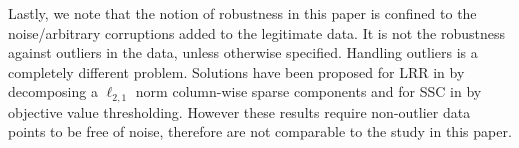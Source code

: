 \documentclass[main]{subfiles}
\begin{document}





Lastly, we note that the notion of robustness in this paper is confined to the noise/arbitrary corruptions added to the legitimate data. It is not the robustness against outliers in the data, unless otherwise specified. Handling outliers is a completely different problem. Solutions have been proposed for LRR in \cite{liu2012aistats} by decomposing a $\ell_{2,1}$ norm column-wise sparse components and for SSC in \cite{soltanolkotabi2011geometric} by objective value thresholding. However these results require non-outlier data points to be free of noise, therefore are not comparable to the study in this paper.
\end{document}
